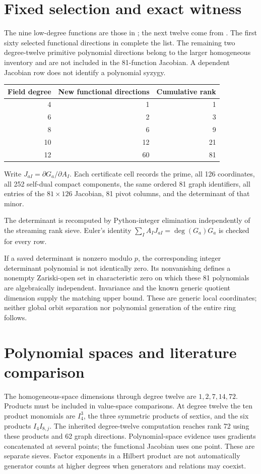 \documentclass[11pt]{article}
\begin{document}
\section{Fixed selection and exact witness}
The nine low-degree functions are those in
; the next twelve come from
. The first sixty selected functional
directions in  complete the list.
The remaining two degree-twelve primitive polynomial directions belong to
the larger homogeneous inventory and are not included in the 81-function
Jacobian. A dependent Jacobian row does not identify a polynomial syzygy.

\begin{center}
\begin{tabular}{rrr}
\toprule
Field degree & New functional directions & Cumulative rank\\
\midrule
4 & 1 & 1\\
6 & 2 & 3\\
8 & 6 & 9\\
10 & 12 & 21\\
12 & 60 & 81\\
\bottomrule
\end{tabular}
\end{center}

Write $J_{aI}=\partial G_a/\partial A_I$. Each certificate cell records
the prime, all 126 coordinates, all 252 self-dual compact components,
the same ordered 81 graph identifiers, all entries of the $81\times126$
Jacobian, 81 pivot columns, and the determinant of that minor.

The determinant is recomputed by Python-integer elimination independently
of the streaming rank sieve. Euler's identity
$\sum_I A_I J_{aI}=\deg(G_a)G_a$ is checked for every row.

If a saved determinant is nonzero modulo $p$, the corresponding integer
determinant polynomial is not identically zero. Its nonvanishing defines a
nonempty Zariski-open set in characteristic zero on which these 81
polynomials are algebraically independent. Invariance and the known generic
quotient dimension supply the matching upper bound. These are generic local
coordinates; neither global orbit separation nor polynomial generation of
the entire ring follows.

\section{Polynomial spaces and literature comparison}
The homogeneous-space dimensions through degree twelve are
$1,2,7,14,72$. Products must be included in value-space comparisons.
At degree twelve the ten product monomials are $I_4^3$, the three symmetric
products of sextics, and the six products $I_4 I_{8,j}$. The inherited
degree-twelve computation reaches rank 72 using these products and 62 graph
directions. Polynomial-space evidence uses gradients concatenated at several
points; the functional Jacobian uses one point. These are separate sieves.
Factor exponents in a Hilbert product are not automatically generator counts
at higher degrees when generators and relations may coexist.
\end{document}
